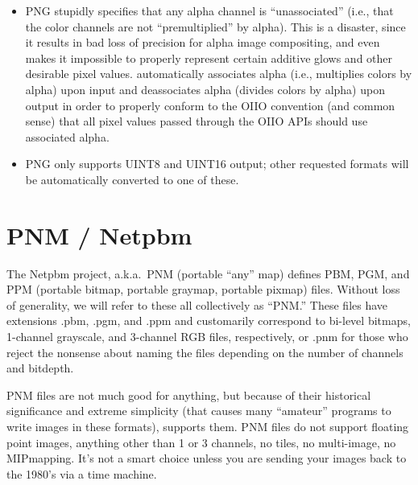 \begin{itemize}
\item PNG stupidly specifies that any alpha channel is ``unassociated''
  (i.e., that the color channels are not ``premultiplied'' by alpha).
  This is a disaster, since it results in bad loss of precision for
  alpha image compositing, and even makes it impossible to properly
  represent certain additive glows and other desirable pixel values.
  \product automatically associates alpha (i.e., multiplies colors by
  alpha) upon input and deassociates alpha (divides colors by alpha)
  upon output in order to properly conform to the OIIO convention (and
  common sense) that all pixel values passed through the OIIO APIs
  should use associated alpha.
\item PNG only supports UINT8 and UINT16 output; other requested formats
  will be automatically converted to one of these.
\end{itemize}


\vspace{.25in}

\section{PNM / Netpbm}
\label{sec:bundledplugins:pnm}

The Netpbm project, a.k.a.\ PNM (portable ``any'' map) defines PBM, PGM,
and PPM (portable bitmap, portable graymap, portable pixmap) files.
Without loss of generality, we will refer to these all collectively as
``PNM.''  These files have extensions {\cf .pbm}, {\cf .pgm}, and
{\cf .ppm} and customarily correspond to bi-level bitmaps, 1-channel
grayscale, and 3-channel RGB files, respectively, or {\cf .pnm} for
those who reject the nonsense about naming the files depending on the
number of channels and bitdepth.

PNM files are not much good for anything, but because of their
historical significance and extreme simplicity (that causes many
``amateur'' programs to write images in these formats), \product
supports them.  PNM files do not support floating point images, anything
other than 1 or 3 channels, no tiles, no multi-image, no MIPmapping.
It's not a smart choice unless you are sending your images back to the
1980's via a time machine.

\vspace{.125in}

